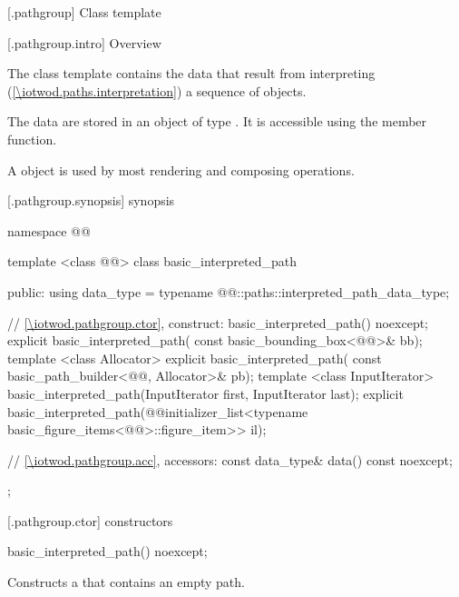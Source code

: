  [\iotwod.pathgroup] {Class template }

 [\iotwod.pathgroup.intro] {Overview}

\pnum
{}%
The class template  contains the data that result from interpreting (\ref{\iotwod.paths.interpretation}) a sequence of  objects.

\pnum
The data are stored in an object of type . It is accessible using the  member function.

\pnum
A  object is used by most rendering and composing operations.

 [\iotwod.pathgroup.synopsis] { synopsis}

\begin{codeblock}
namespace @\fullnamespace{}@ {
  template <class @\graphicssurfacestemplparamnospace{}@>
  class basic_interpreted_path {
  public:
    using data_type = typename 
      @\graphicssurfacestemplparamnospace{}@::paths::interpreted_path_data_type;
      
    // \ref{\iotwod.pathgroup.ctor}, construct:
    basic_interpreted_path() noexcept;
    explicit basic_interpreted_path(
      const basic_bounding_box<@\graphicsmathtemplparamnospace{}@>& bb);
    template <class Allocator>
    explicit basic_interpreted_path(
      const basic_path_builder<@\graphicssurfacestemplparamnospace{}@, Allocator>& pb);
    template <class InputIterator>
    basic_interpreted_path(InputIterator first, InputIterator last);
    explicit basic_interpreted_path(@\stdqualifier{}@initializer_list<typename
      basic_figure_items<@\graphicssurfacestemplparamnospace{}@>::figure_item>> il);    
    
    // \ref{\iotwod.pathgroup.acc}, accessors:
    const data_type& data() const noexcept;
  };
}
\end{codeblock}

 [\iotwod.pathgroup.ctor] { constructors}

%
\begin{itemdecl}
basic_interpreted_path() noexcept;
\end{itemdecl}
\begin{itemdescr}
\pnum
\effects
Constructs a  that contains an empty path.
\end{itemdescr}


